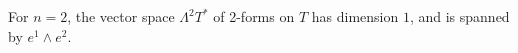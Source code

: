 For $n = 2$, the vector space $\Lambda^2 T^*$ of 2-forms on $T$ has dimension $1$, and is spanned by $e^1 \wedge e^2$.
